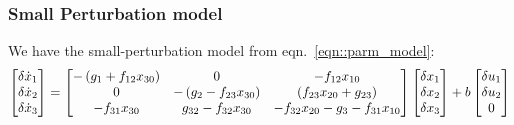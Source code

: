 \subsubsection{Small Perturbation model}
We have the small-perturbation model from eqn.~\ref{eqn::parm_model}:
\begin{equation}\label{eqn::sml_ptrb}
     \begin{bmatrix} \delta \dot x_1 \\
        \delta \dot x_2\\
        \delta \dot x_3\\
         \end{bmatrix} =
    \begin{bmatrix} 
        -\left( g_1 + f_{12} x_{30} \right) &
        0                                  &
        -f_{12} x_{10}
        \\
        0 &
        -\left( g_2 - f_{23} x_{30} \right) &
        \left( f_{23} x_{20}+ g_{23} \right)
        \\
        -f_{31} x_{30}  &
        g_{32} - f_{32} x_{30}&
        -f_{32} x_{20} - g_3 - f_{31} x_{10}
     \end{bmatrix}
    \begin{bmatrix} \delta x_1\\
        \delta x_2\\
        \delta x_3\\
         \end{bmatrix}
    + b \begin{bmatrix} \delta u_1 \\ \delta u_2 \\ 0 \end{bmatrix}
\end{equation}




%
